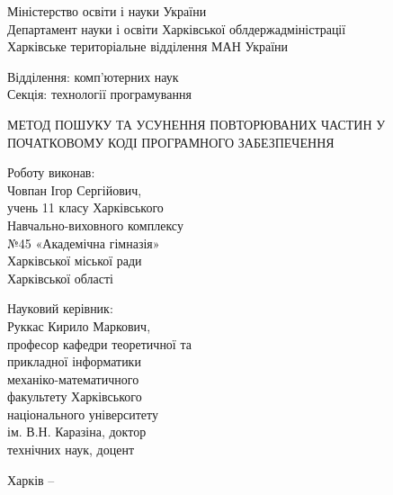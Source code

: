 \documentclass[a4paper, 14pt]{article}
\begin{document}
\thispagestyle{empty}
\begin{spacing}{1}
\begin{center}
Міністерство освіти і науки України\\
Департамент науки і освіти Харківської облдержадміністрації\\
Харківське територіальне відділення МАН України\\
\end{center}\par\null\par
\begin{changemargin}{9.82cm}{0cm}
Відділення: комп'ютерних наук\\
Секція: технології програмування
\end{changemargin}\par\null\par
\begin{center}
МЕТОД ПОШУКУ ТА УСУНЕННЯ ПОВТОРЮВАНИХ
ЧАСТИН У ПОЧАТКОВОМУ КОДІ ПРОГРАМНОГО ЗАБЕЗПЕЧЕННЯ
\end{center}\par\null\par\null
\begin{changemargin}{9.82cm}{0cm}
Роботу виконав:\\ 
Човпан Ігор Сергійович,\\
учень 11 класу Харківського\\
Навчально-виховного комплексу\\
№45 «Академічна гімназія»\\
Харківської міської ради\\
Харківської області
\end{changemargin}\par
\begin{changemargin}{9.82cm}{0cm}
Науковий керівник:\\
Руккас Кирило Маркович,\\
професор кафедри теоретичної та\\
прикладної інформатики\\
механіко-математичного\\
факультету Харківського\\
національного університету\\
ім. В.Н. Каразіна, доктор\\
технічних наук, доцент\\
\vspace*{\fill}\end{changemargin}
\begin{center}
Харків -- \the\year{}
\end{center}\end{spacing}
\end{document}
